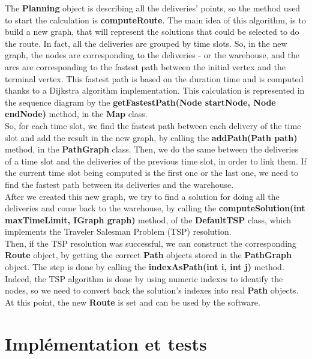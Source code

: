 \documentclass[paper=a4, fontsize=11pt]{report}
\numberwithin{equation}{section}		%
\numberwithin{figure}{section}		%
\numberwithin{table}{section}		%
\renewcommand{\bf}[1]{\textbf{#1}}
\begin{document}
The \bf{Planning} object is describing all the deliveries’ points, so the method used to start the calculation is \bf{computeRoute}. The main idea of this algorithm, is to build a new graph, that will represent the solutions that could be selected to do the route. In fact, all the deliveries are grouped by time slots. So, in the new graph, the nodes are corresponding to the deliveries - or the warehouse, and the arcs are corresponding to the fastest path between the initial vertex and the terminal vertex. This fastest path is based on the duration time and is computed thanks to a Dijkstra algorithm implementation. This calculation is represented in the sequence diagram by the \bf{getFastestPath(Node startNode, Node endNode)} method, in the \bf{Map} class.\\

So, for each time slot, we find the fastest path between each delivery of the time slot and add the result in the new graph, by calling the \bf{addPath(Path path)} method, in the \bf{PathGraph} class. Then, we do the same between the deliveries of a time slot and the deliveries of the previous time slot, in order to link them. If the current time slot being computed is the first one or the last one, we need to find the fastest path between its deliveries and the warehouse.\\

After we created this new graph, we try to find a solution for doing all the deliveries and come back to the warehouse, by calling the \bf{computeSolution(int maxTimeLimit, IGraph graph)} method, of the \bf{DefaultTSP} class, which implements the Traveler Salesman Problem (TSP) resolution.\\

Then, if the TSP resolution was successful, we can construct the corresponding \bf{Route} object, by getting the correct \bf{Path} objects stored in the \bf{PathGraph} object. The step is done by calling the \bf{indexAsPath(int i, int j)} method. Indeed, the TSP algorithm is done by using numeric indexes to identify the nodes, so we need to convert back the solution’s indexes into real \bf{Path} objects.\\

At this point, the new \bf{Route} is set and can be used by the software.


\part{Implémentation et tests}
\label{part:implementation-et-tests}
\setcounter{section}{0}
\end{document}
